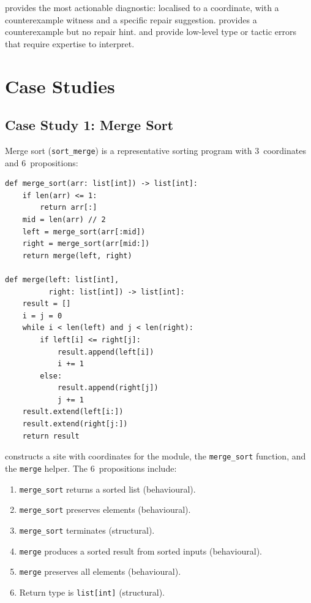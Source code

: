 \documentclass[11pt]{article}
\begin{document}
\JuGeo{} provides the most actionable diagnostic: localised to a
coordinate, with a counterexample witness and a specific repair
suggestion.  \Dafny{} provides a counterexample but no repair hint.
\Fstar{} and \LEAN{} provide low-level type or tactic errors that
require expertise to interpret.

\section{Case Studies}\label{sec:cases}

\subsection{Case Study 1: Merge Sort}

Merge sort (\texttt{sort\_merge}) is a representative sorting
program with 3~coordinates and 6~propositions:

\begin{lstlisting}[style=jugeo-python,caption={Merge sort implementation.}]
def merge_sort(arr: list[int]) -> list[int]:
    if len(arr) <= 1:
        return arr[:]
    mid = len(arr) // 2
    left = merge_sort(arr[:mid])
    right = merge_sort(arr[mid:])
    return merge(left, right)

def merge(left: list[int],
          right: list[int]) -> list[int]:
    result = []
    i = j = 0
    while i < len(left) and j < len(right):
        if left[i] <= right[j]:
            result.append(left[i])
            i += 1
        else:
            result.append(right[j])
            j += 1
    result.extend(left[i:])
    result.extend(right[j:])
    return result
\end{lstlisting}

\JuGeo{} constructs a site with coordinates for the module, the
\texttt{merge\_sort} function, and the \texttt{merge} helper.
The 6~propositions include:

\begin{enumerate}[nosep]
\item \texttt{merge\_sort} returns a sorted list (behavioural).
\item \texttt{merge\_sort} preserves elements (behavioural).
\item \texttt{merge\_sort} terminates (structural).
\item \texttt{merge} produces a sorted result from sorted inputs
  (behavioural).
\item \texttt{merge} preserves all elements (behavioural).
\item Return type is \texttt{list[int]} (structural).
\end{enumerate}
\end{document}
